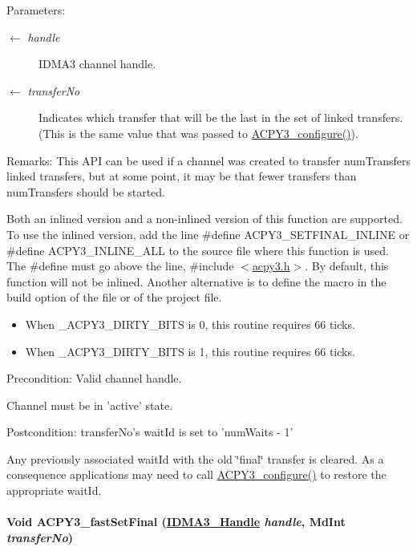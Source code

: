 \begin{Desc}
\item[Parameters:]
\begin{description}
\item[\mbox{$\leftarrow$} {\em handle}]IDMA3 channel handle. \item[\mbox{$\leftarrow$} {\em transfer\-No}]Indicates which transfer that will be the last in the set of linked transfers. (This is the same value that was passed to \hyperlink{group___d_s_p_a_c_p_y3_g427e8e4fd5c445b2f9bb5d971c06c099}{ACPY3\_\-configure()}).\end{description}
\end{Desc}
\begin{Desc}
\item[Remarks:]This API can be used if a channel was created to transfer num\-Transfers linked transfers, but at some point, it may be that fewer transfers than num\-Transfers should be started. 

Both an inlined version and a non-inlined version of this function are supported. To use the inlined version, add the line \#define ACPY3\_\-SETFINAL\_\-INLINE or \#define ACPY3\_\-INLINE\_\-ALL to the source file where this function is used. The \#define must go above the line, \#include $<$\hyperlink{acpy3_8h}{acpy3.h}$>$. By default, this function will not be inlined. Another alternative is to define the macro in the build option of the file or of the project file.

\begin{itemize}
\item When \_\-ACPY3\_\-DIRTY\_\-BITS is 0, this routine requires 66 ticks.\item When \_\-ACPY3\_\-DIRTY\_\-BITS is 1, this routine requires 66 ticks.\end{itemize}
\end{Desc}
\begin{Desc}
\item[Precondition:]Valid channel handle. 

Channel must be in 'active' state.\end{Desc}
\begin{Desc}
\item[Postcondition:]transfer\-No's wait\-Id is set to 'num\-Waits - 1' 

Any previously associated wait\-Id with the old \char`\"{}final\char`\"{} transfer is cleared. As a consequence applications may need to call \hyperlink{group___d_s_p_a_c_p_y3_g427e8e4fd5c445b2f9bb5d971c06c099}{ACPY3\_\-configure()} to restore the appropriate wait\-Id. \end{Desc}
\hypertarget{group___d_s_p_a_c_p_y3_g44f2ce173d41bc7bbfb6e7fb500ec58f}{
\paragraph[ACPY3\_\-fastSetFinal]{\setlength{\rightskip}{0pt plus 5cm}Void ACPY3\_\-fast\-Set\-Final (\hyperlink{struct_i_d_m_a3___obj}{IDMA3\_\-Handle} {\em handle}, Md\-Int {\em transfer\-No})}\hfill}
\label{group___d_s_p_a_c_p_y3_g44f2ce173d41bc7bbfb6e7fb500ec58f}


